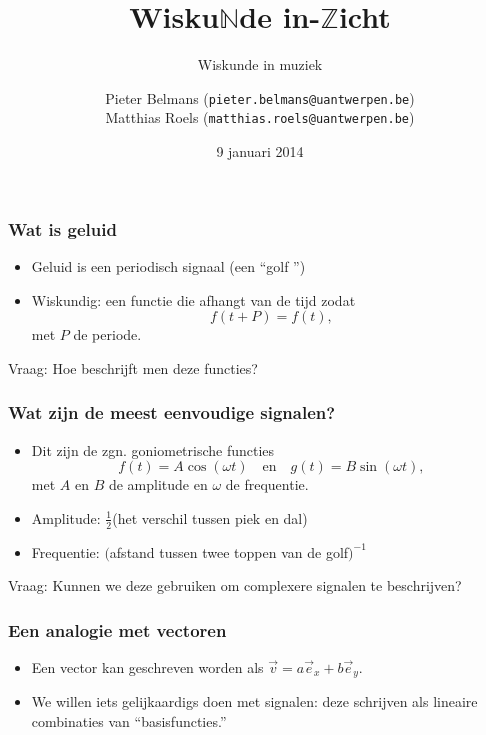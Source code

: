 \documentclass[compress, darktitle, framenumber]{beamer}
\title{Wisku$\mathbb{N}$de in-$\mathbb{Z}$icht}
\subtitle{Wiskunde in muziek}
\author{Pieter Belmans (\texttt{pieter.belmans@uantwerpen.be}) \\ Matthias Roels (\texttt{matthias.roels@uantwerpen.be})}
\date{9 januari 2014}
\begin{document}
\begin{frame}
  \titlepage
\end{frame}

\begin{frame}
\frametitle{Wat is geluid}
\begin{itemize}
\item Geluid is een periodisch signaal (een ``golf '') 
\item Wiskundig: een functie die afhangt van de tijd zodat $$f(t+P)=f(t),$$ met $P$ de periode.
\end{itemize}
\begin{alertblock}{Vraag:}
Hoe beschrijft men deze functies? 
\end{alertblock}
\end{frame}

\begin{frame}
\frametitle{Wat zijn de meest eenvoudige signalen?}
\begin{itemize}
\item Dit zijn de zgn. goniometrische functies $$f(t)=A\cos (\omega t) \quad \text{en} \quad g(t)=B\sin (\omega t),$$ met $A$ en $B$ de amplitude en $\omega$ de frequentie. 
\item Amplitude: $\frac{1}{2}$(het verschil tussen piek en dal)
\item Frequentie: $($afstand tussen twee toppen van de golf$)^{-1}$
\end{itemize}
\begin{alertblock}{Vraag:}
Kunnen we deze gebruiken om complexere signalen te beschrijven?  
\end{alertblock}
\end{frame}

\begin{frame}[fragile]
\frametitle{Een analogie met vectoren}
\begin{itemize}
\item Een vector kan geschreven worden als $\vec{v}=a\vec{e}_x+b\vec{e}_y.$
\end{itemize}
\begin{itemize}
\item We willen iets gelijkaardigs doen met signalen: deze schrijven als lineaire combinaties van ``basisfuncties.''
\end{itemize}
\end{frame}
\end{document}

